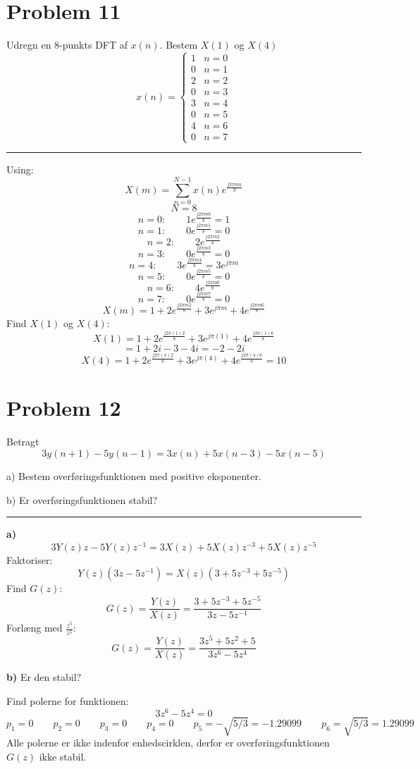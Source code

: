 \section*{Problem 11}
Udregn en 8-punkts DFT af $x(n)$. Bestem $X(1)$ og $X(4)$
$$x(n)=\begin{cases}
  1&n=0\\
  0&n=1\\
  2&n=2\\
  0&n=3\\
  3&n=4\\
  0&n=5\\
  4&n=6\\
  0&n=7
\end{cases}$$

\rule{\textwidth}{0.5pt}
Using:
$$X(m)=\sum_{n=0}^{N-1}x(n)e^{\frac{j2\pi m n}{N}}$$
$$N=8$$
$$n=0:\qquad 1e^{\frac{j2\pi m 0}{8}}=1$$
$$n=1:\qquad 0e^{\frac{j2\pi m 1}{8}}=0$$
$$n=2:\qquad 2e^{\frac{j2\pi m 2}{8}}$$
$$n=3:\qquad 0e^{\frac{j2\pi m 3}{8}}=0$$
$$n=4:\qquad 3e^{\frac{j2\pi m 4}{8}}=3e^{j\pi m}$$
$$n=5:\qquad 0e^{\frac{j2\pi m 5}{8}}=0$$
$$n=6:\qquad 4e^{\frac{j2\pi m 6}{8}}$$
$$n=7:\qquad 0e^{\frac{j2\pi m 7}{8}}=0$$
$$X(m)=1+2e^{\frac{j2\pi m 2}{8}}+3e^{j\pi m}+4e^{\frac{j2\pi m 6}{8}}$$
Find $X(1)$ og $X(4)$:
$$X(1)=1+2e^{\frac{j2\pi (1) 2}{8}}+3e^{j\pi (1)}+4e^{\frac{j2\pi (1) 6}{8}}$$
$$=1+2i-3-4i=-2 - 2i$$
$$X(4)=1+2e^{\frac{j2\pi (4) 2}{8}}+3e^{j\pi (4)}+4e^{\frac{j2\pi (4) 6}{8}}=10$$

\section*{Problem 12}
Betragt
$$3y(n+1)-5y(n-1)=3x(n)+5x(n-3)-5x(n-5)$$

a) Bestem overføringsfunktionen med positive eksponenter.

b) Er overføringsfunktionen stabil?

\rule{\textwidth}{0.5pt}
\textbf{a)}
$$3Y(z)z-5Y(z)z^{-1}=3X(z)+5X(z)z^{-3}+5X(z)z^{-5}$$
Faktoriser:
$$Y(z)(3z-5z^{-1})=X(z)(3+5z^{-3}+5z^{-5})$$
Find $G(z)$:
$$G(z)=\frac{Y(z)}{X(z)}=\frac{3+5z^{-3}+5z^{-5}}{3z-5z^{-1}}$$
Forlæng med $\frac{z^5}{z^5}$:
$$\boxed{G(z)=\frac{Y(z)}{X(z)}=\frac{3z^5+5z^{2}+5}{3z^6-5z^{4}}}$$

\textbf{b)} Er den stabil?

Find polerne for funktionen:
$$3z^6-5z^4=0$$
$$p_1=0\qquad p_2=0\qquad p_3=0\qquad p_4=0\qquad p_5=-\sqrt{5/3}=-1.29099\qquad p_6=\sqrt{5/3}=1.29099$$
Alle polerne er ikke indenfor enhedscirklen, derfor er overføringsfunktionen $G(z)$ ikke stabil.
